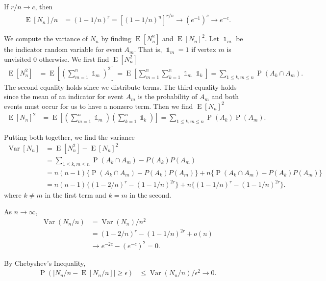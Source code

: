 \documentclass[12pt]{article}
\theoremstyle{definition}
\DeclareMathOperator{\E}{\mathrm{E}}		     %
\DeclareMathOperator{\Var}{\mathrm{Var}}         %
\DeclareMathOperator{\I}{\mathbb{1}}             %
\DeclareMathOperator{\pr}{\mathrm{P}}		     %
\begin{document}
If $r/n \rightarrow c$, then
\begin{align}
\E[N_n]/n &= (1-1/n)^r = [(1-1/n)^n]^{r/n} \rightarrow (e^{-1})^c
\rightarrow e^{-c}. \nonumber
\end{align}

We compute the variance of $N_n$ by finding $\E[N_n^2]$ and $\E[N_n]^2$.
Let $\I_m$ be the indicator random variable for event $A_m$.
That is, $\I_m = 1$ if vertex $m$ is unvisited 0 otherwise.
We first find $\E[N_n^2]$
\begin{align}
\E[N_n^2] &= \E \left[ \left(\sum_{m=1}^n \I_m \right) ^2 \right] =
\E \left[ \sum_{m=1}^n \sum_{k=1}^n \I_m \I_k \right] =
\sum_{1 \leq k, m \leq n} \pr(A_k \cap A_m). \nonumber
\end{align}
The second equality holds since we distribute terms.
The third equality holds since the mean of an indicator for event $A_m$
is the probability of $A_m$ and both events must occur for
us to have a nonzero term.
Then we find $\E[N_n]^2$
\begin{align}
\E[N_n]^2 &= \E \left[ \left(\sum_{m=1}^n \I_m \right)
\left( \sum_{k=1}^n \I_k \right) \right] =
\sum_{1 \leq k, m \leq n} \pr(A_k) \pr(A_m).
\nonumber
\end{align}

Putting both together, we find the variance
\begin{align}
\Var[N_n] &= \E[N_n^2] - \E[N_n]^2 \nonumber \\
&= \sum_{1 \leq k, m \leq n} \pr(A_k \cap A_m) - P(A_k)P(A_m) \nonumber \\
&= n(n-1) \{ \pr(A_k \cap A_m) - P(A_k)P(A_m) \} + 
n \{ \pr(A_k \cap A_m) - P(A_k)P(A_m) \} \nonumber \\
&= n(n-1) \{ (1-2/n)^r - (1-1/n)^{2r} \} + 
n \{ (1-1/n)^r  - (1-1/n)^{2r} \}. \nonumber
\end{align}
where $k\neq m$ in the first term and $k=m$ in the second.

As $n \rightarrow \infty$,
\begin{align}
\Var(N_n/n) &= \Var(N_n) / n^2 \nonumber\\
&= (1-2/n)^r - (1-1/n)^{2r} + o(n) \nonumber\\
&\rightarrow e^{-2c} - (e^{-c})^2 = 0. \nonumber
\end{align}

By Chebyshev's Inequality,
\begin{align}
\pr \left( |N_n/n - \E[N_n/n]| \geq \epsilon \right) &\leq \Var(N_n/n) / \epsilon^2
\rightarrow 0. \nonumber
\end{align}
\end{document}
